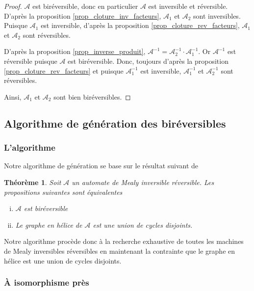 \documentclass[11pt,a4paper]{article}
\newtheorem{thm}{Théorème}
\begin{document}
\begin{proof}
    $\mathcal{A}$ est biréversible, donc en particulier $\mathcal{A}$ est inversible et réversible. D'après la proposition \ref{prop_cloture_inv_facteurs}, $\mathcal{A}_1$ et $\mathcal{A}_2$ sont inversibles. Puisque $\mathcal{A}_1$ est inversible, d'après la proposition \ref{prop_cloture_rev_facteurs}, $\mathcal{A}_1$ et $\mathcal{A}_2$ sont réversibles.

    D'après la proposition \ref{prop_inverse_produit}, $\mathcal{A}^{-1} = \mathcal{A}_2^{-1} \cdot \mathcal{A}_1^{-1}$. Or $\mathcal{A}^{-1}$ est réversible puisque $\mathcal{A}$ est biréversible. Donc, toujours d'après la proposition \ref{prop_cloture_rev_facteurs} et puisque $\mathcal{A}_1^{-1}$ est inversible, $\mathcal{A}_1^{-1}$ et $\mathcal{A}_2^{-1}$ sont réversibles.

    Ainsi, $\mathcal{A}_1$ et $\mathcal{A}_2$ sont bien biréversibles.
\end{proof}

\subsection{Algorithme de génération des biréversibles\label{sec:gen}}

\subsubsection*{L'algorithme}
Notre algorithme de génération se base sur le résultat suivant de \cite{DBLP:journals/corr/abs-1105-4725}

\begin{thm}
  \label{thm:ir-helix}
  Soit $\mathcal{A}$ un automate de Mealy inversible réversible. Les propositions suivantes sont équivalentes

  \begin{enumerate}[(i)]
  \item $\mathcal{A}$ est biréversible
  \item Le graphe en hélice de $\mathcal{A}$ est une union de cycles disjoints.
  \end{enumerate}
\end{thm}

Notre algorithme procède donc à la recherche exhaustive de toutes les machines de Mealy inversibles réversibles en maintenant la contrainte que le graphe en hélice est une union de cycles disjoints.

\subsubsection*{À isomorphisme près}
\end{document}
